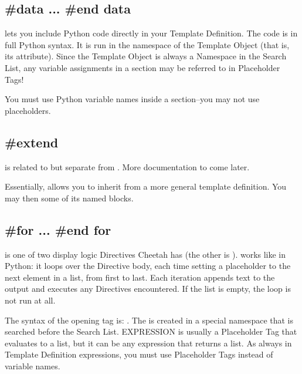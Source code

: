 \subsection{\#data ... \#end data}

 lets you include Python code directly in your Template 
Definition.  The code is in full Python syntax.  It is run in the namespace of
the Template Object (that is, its  attribute).  Since the Template
Object is always a Namespace in the Search List, any variable assignments in a
 section may be referred to in Placeholder Tags!

You must use Python variable names inside a  section--you may not
use placeholders.

\subsection{\#extend}

 is related to but separate from 
.  More documentation to come later.

Essentially,  allows you to inherit from
a more general template definition.  You may then  some of its
named blocks.

\subsection{\#for ... \#end for}

 is one of two display logic Directives Cheetah has (the other is
).   works like in Python: it loops over the Directive
body, each time setting a placeholder to the next element in a list, from first
to last.  Each iteration appends text to the output and executes any
Directives encountered.  If the list is empty, the loop is not run at all.

The syntax of the opening tag is: .  The  is created in a special namespace
that is searched before the Search List.  EXPRESSION is usually a 
Placeholder Tag that evaluates to a list, but it can be any expression that
returns a list.  As always in Template Definition expressions, you must use
Placeholder Tags instead of variable names.

